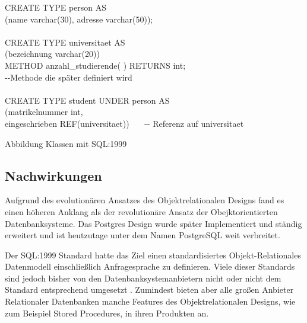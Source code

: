 \vspace{.3cm}
\begin{algorithm}[H]
	CREATE TYPE person AS \\
	\Indp
		(name varchar(30), adresse varchar(50)); \\
	\Indm 
	~ \\
	CREATE TYPE universitaet AS \\
	\Indp
		(bezeichnung varchar(20)) \\
		METHOD anzahl\_studierende( ) RETURNS int;   \\ \Indp -{}-Methode die später definiert wird \\ \Indm
	\Indm
	~ \\
	CREATE TYPE student UNDER person AS \\
	\Indp
		(matrikelnummer int, \\
		eingeschrieben REF(universitaet)) ~~~-{}- Referenz auf universitaet \\
	\Indm
	\caption{Abbildung Klassen mit SQL:1999}
	\label{sql1999example}
\end{algorithm}
\vspace{.3cm}

\subsection{Nachwirkungen}
Aufgrund des evolutionären Ansatzes des Objektrelationalen Designs fand es einen höheren Anklang als der revolutionäre Ansatz der Obejktorientierten Datenbanksysteme. Das Postgres Design wurde später Implementiert und ständig erweitert und ist heutzutage unter dem Namen PostgreSQL weit verbreitet. 

Der SQL:1999 Standard hatte das Ziel einen standardisiertes Objekt-Relationales Datenmodell einschließlich Anfragesprache zu definieren. Viele dieser Standards sind jedoch bisher von den Datenbanksystemanbietern nicht oder nicht dem Standard entsprechend umgesetzt \cite{kemper2013}. Zumindest bieten aber alle großen Anbieter Relationaler Datenbanken manche Features des Objektrelationalen Designs, wie zum Beispiel Stored Procedures, in ihren Produkten an.


